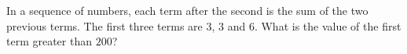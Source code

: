 In a sequence of numbers, each term after the second is the sum of the two previous terms. The first three terms are $3$, $3$ and $6$. What is the value of the first term greater than $200$?
